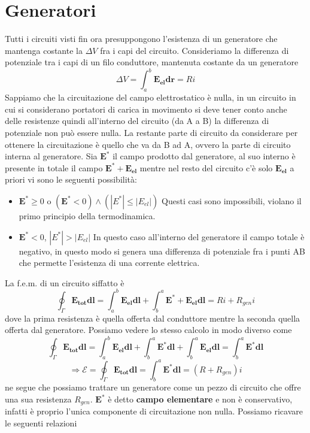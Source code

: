 \documentclass[
10pt, %
a4paper, %
oneside, %
headinclude,footinclude, %
BCOR5mm, %
]{scrartcl}
\begin{document}
\section{Generatori}
Tutti i circuiti visti fin ora presuppongono l'esistenza di un generatore che mantenga costante la \(\Delta V\) fra i capi del circuito. Consideriamo la differenza di potenziale tra i capi di un filo conduttore, mantenuta costante da un generatore
\[\Delta V = \int_a^b \mathbf{E_{el}}\mathbf{dr}= Ri\]
Sappiamo che la circuitazione del campo elettrostatico è nulla, in un circuito in cui si considerano portatori di carica in movimento si deve tener conto anche delle resistenze quindi all'interno del circuito (da A a B) la differenza di potenziale non può essere nulla. La restante parte di circuito da considerare per ottenere la circuitazione è quello che va da B ad A, ovvero la parte di circuito interna al generatore. Sia \(\mathbf{E^*}\) il campo prodotto dal generatore, al suo interno è presente in totale il campo \(\mathbf{E^*}+\mathbf{E_{el}}\) mentre nel resto del circuito c'è solo \(\mathbf{E_{el}}\) a priori vi sono le seguenti possibilità:
\begin{itemize}
	\item \(\mathbf{E^*} \geq 0\) o \((\mathbf{E^*} < 0) \wedge (|{E^*}| \leq |{E_{el}}|)\) Questi casi sono impossibili, violano il primo principio della termodinamica.
	\item \(\mathbf{E^*} < 0\),  \(|{E^*}| > |{E_{el}}|\) In questo caso all'interno del generatore il campo totale è negativo, in questo modo si genera una differenza di potenziale fra i punti AB che permette l'esistenza di una corrente elettrica. 
\end{itemize}
La f.e.m. di un circuito siffatto è 
\[\oint_{\Gamma}\mathbf{E_{tot}}\mathbf{dl}= \int_{a}^{b}\mathbf{E_{el}}\mathbf{dl}+\int_{b}^{a}\mathbf{E^*}+\mathbf{E_{el}}\mathbf{dl}= Ri + R_{gen}i\]
dove la prima resistenza è quella offerta dal conduttore mentre la seconda quella offerta dal generatore. Possiamo vedere lo stesso calcolo in modo diverso come
\[\oint_{\Gamma}\mathbf{E_{tot}}\mathbf{dl}= \int_{a}^{b}\mathbf{E_{el}}\mathbf{dl} + \int_{b}^{a}\mathbf{E^*}\mathbf{dl} +  \int_{b}^{a}\mathbf{E_{el}}\mathbf{dl}= \int_{b}^{a}\mathbf{E^*}\mathbf{dl}\]
\[\Rightarrow \mathcal{E} = \oint_{\Gamma}\mathbf{E_{tot}}\mathbf{dl} = \int_{b}^{a}\mathbf{E^*}\mathbf{dl} = (R + R_{gen})i \]
ne segue che possiamo trattare un generatore come un pezzo di circuito che offre una sua resistenza \(R_{gen}\). \(\mathbf{E^*}\) è detto \textbf{campo elementare} e non è conservativo, infatti è proprio l'unica componente di circuitazione non nulla. Possiamo ricavare le seguenti relazioni
\end{document}

